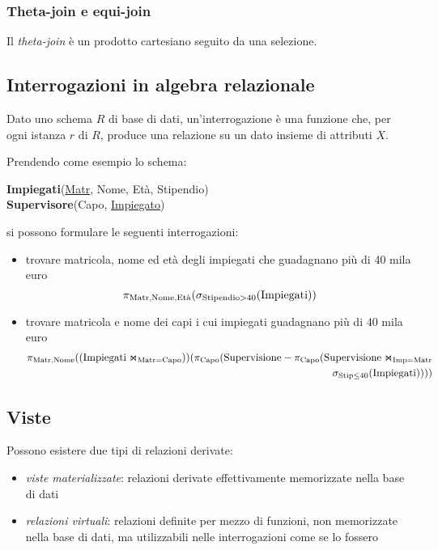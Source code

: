 \documentclass[11pt]{book}
\begin{document}
\subsubsection{Theta-join e equi-join}
Il \textit{theta-join} è un prodotto cartesiano seguito da una selezione.
\subsection{Interrogazioni in algebra relazionale}
Dato uno schema $R$ di base di dati, un'interrogazione è una funzione che, per ogni istanza $r$ di $R$, produce una relazione 
su un dato insieme di attributi $X$.

Prendendo come esempio lo schema:
\begin{center}
    \textbf{Impiegati}(\underline{Matr}, Nome, Età, Stipendio)\\
    \textbf{Supervisore}(Capo, \underline{Impiegato})
\end{center}
si possono formulare le seguenti interrogazioni:
\begin{itemize}
    \item trovare matricola, nome ed età degli impiegati che guadagnano più di 40 mila euro
    \begin{equation*}
        \pi_{\textnormal{Matr,Nome,Età}}(\sigma_{\textnormal{Stipendio$>$40}}(\textnormal{Impiegati}))
    \end{equation*}
    \item trovare matricola e nome dei capi i cui impiegati guadagnano più di 40 mila euro 
    \begin{align*}
        \pi_{\textnormal{Matr,Nome}}((\textnormal{Impiegati}\Join_{\textnormal{Matr=Capo}}))(\pi_{\textnormal{Capo}}
        (\textnormal{Supervisione}-\pi_{\textnormal{Capo}}(\textnormal{Supervisione}\Join_{\textnormal{Imp=Matr}}
        \\\sigma_{\textnormal{Stip$\leq$40}}(\textnormal{Impiegati}))))
    \end{align*}
\end{itemize}
\subsection{Viste}
Possono esistere due tipi di relazioni derivate:
\begin{itemize}
    \item \textit{viste materializzate}: relazioni derivate effettivamente memorizzate nella base di dati 
    \item \textit{relazioni virtuali}: relazioni definite per mezzo di funzioni, non memorizzate nella base di dati, ma 
    utilizzabili nelle interrogazioni come se lo fossero
\end{itemize}
\end{document}
